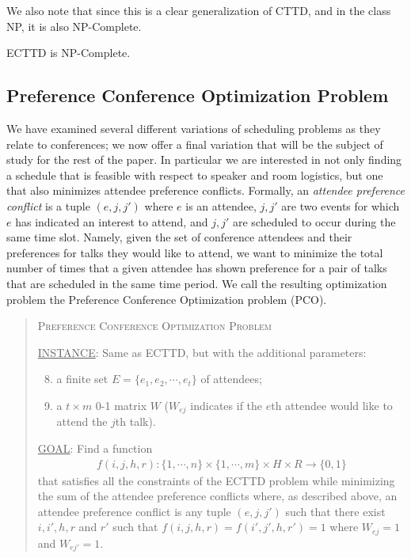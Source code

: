\documentclass{svjour3}                     %
\begin{document}
We also note that since this is a clear generalization of CTTD, and in the class NP, it is also NP-Complete.
\begin{proposition}
	ECTTD is NP-Complete.
\end{proposition}

\subsection{Preference Conference Optimization Problem}
We have examined several different variations of scheduling problems as they relate to conferences; we now offer a final variation that will be the subject of study for the rest of the paper. 
In particular we are interested in not only finding a schedule that is feasible with respect to speaker and room logistics,  but one that also minimizes attendee preference conflicts.
Formally, an \emph{attendee preference conflict} is a tuple $(e,j,j')$ where $e$ is an attendee, $j,j'$ are two events for which $e$ has indicated an interest to attend, and $j,j'$ are scheduled to occur during the same time slot.
Namely, given the set of conference attendees and their preferences for talks they would like to attend, we want to minimize the total number of times that a given attendee has shown preference for a pair of talks that are scheduled in the same time period.
We call the resulting optimization problem the Preference Conference Optimization problem (PCO).
\begin{quote}
	\textsc{Preference Conference Optimization Problem}
	
	\underline{INSTANCE}: Same as ECTTD, but with the additional parameters:
	\begin{enumerate}[1.]
		\setcounter{enumi}{7}
		\item a finite set $E = \{e_1, e_2, \cdots, e_t\}$ of attendees;
		\item a $t \times m$ 0-1 matrix $W$ ($W_{ej}$ indicates if the $e$th attendee would like to attend the $j$th talk).
	\end{enumerate}
	
	\underline{GOAL}: Find a function 
	\begin{gather*}
		f(i,j,h,r) : \{1,\cdots,n\} \times \{1,\cdots,m\} \times H \times R \rightarrow \{0,1\}
	\end{gather*}
	that satisfies all the constraints of the ECTTD problem while minimizing the sum of the attendee preference conflicts where, as described above, an attendee preference conflict is any tuple $(e,j,j')$ such that there exist $i,i',h,r$ and $r'$ such that $f(i,j,h,r)=f(i',j',h,r')=1$ where $W_{ej}=1$ and $W_{ej'}=1$.
\end{quote}
\end{document}
